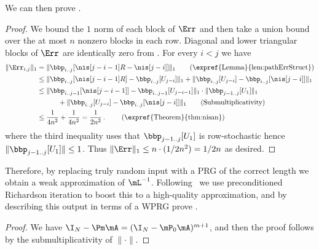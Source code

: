 \documentclass{toc}
\begin{document}
We can then prove .
\begin{proof}
We bound the $1$ norm of each block of $\Err$ and then take a union bound over the at most $n$ nonzero blocks in each row. Diagonal and lower triangular blocks of $\Err$ are identically zero from . For every $i<j$ we have 
\begin{align*}
    \|\Err_{i,j}\|_1 &=\|\bbp_{i..j}[\nis[j-i-1]R-\nis[j-i]]\|_1
    \tag*{\text{(\expref{Lemma}{lem:pathErrStruct})}}\\
    &\leq \|\bbp_{i..j}[\nis[j-i-1]R] -\bbp_{i..j}[U_{j-i}]\|_1+\|\bbp_{i..j}[U_{j-i}]- \bbp_{i..j}[\nis[j-i]]\|_1  \\
    &\leq  \|\bbp_{i..j-1}[\nis[j-i-1]] -\bbp_{i..j-1}[U_{j-i-1}]\|_1\cdot\|\bbp_{j-1..j}[U_1]\|_1\\ 
%
%
%
%
%
    &\quad\quad\quad + \|\bbp_{i..j}[U_{j-i}]- \bbp_{i..j}[\nis[j-i]]\|_1 %
    \tag*{\text{(Submultiplicativity)}} \\
    &\leq \frac{1}{4n^2}+\frac{1}{4n^2} = \frac{1}{2n^2}\,. %
    \tag*{
%
       \text{(\expref{Theorem}{thm:nisan})}}%
\end{align*}
%
where %
the third inequality uses that $\bbp_{j-1..j}[U_1]$ is row-stochastic hence $\|\bbp_{j-1..j}[U_1]\|\leq 1$.
Thus $\|\Err\|_1 \leq n\cdot(1/2n^2)= 1/2n$ as desired.
\end{proof}

Therefore, by replacing truly random input with a PRG of the correct length we obtain a weak approximation of $\mL^{-1}$. Following~\cite{AhmadinejadKeMuPeSiVa19} we use preconditioned Richardson iteration to boost this to a %
high-quality  %
approximation, and by describing this output in terms of a WPRG prove .

\Richardson*
\begin{proof}
We have $\I_N-\Pm\mA= (\I_N-\mP_0\mA)^{m+1}$, and then the proof follows by the submultiplicativity of $\|\cdot\|$.
\end{proof}
\end{document}
